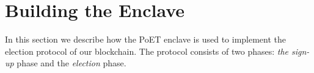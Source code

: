 \section{Building the Enclave}
\label{sec_enclave}

In this section we describe how the PoET enclave is used to implement the election protocol of our blockchain.  The
protocol consists of two phases: \textit{the sign-up} phase and the \textit{election} phase.

